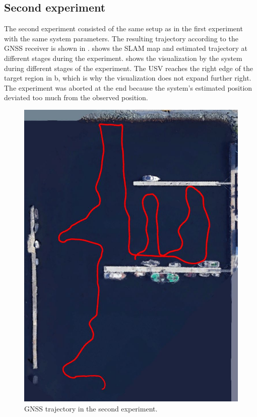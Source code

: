\FloatBarrier

\subsection{Second experiment}

The second experiment consisted of the same setup as in the first experiment with the same system parameters. The resulting trajectory according to the GNSS receiver is shown in .  shows the SLAM map and estimated trajectory at different stages during the experiment.  shows the visualization by the system during different stages of the experiment. The USV reaches the right edge of the target region in b, which is why the visualization does not expand further right. The experiment was aborted at the end because the system's estimated position deviated too much from the observed position.


\begin{figure}[h!]
	\centering
	\includegraphics[height=0.3\textheight]{fig/results/gnss_3.jpg}
	\caption{GNSS trajectory in the second experiment.}
	\label{fig:gnss_test2}
\end{figure}

